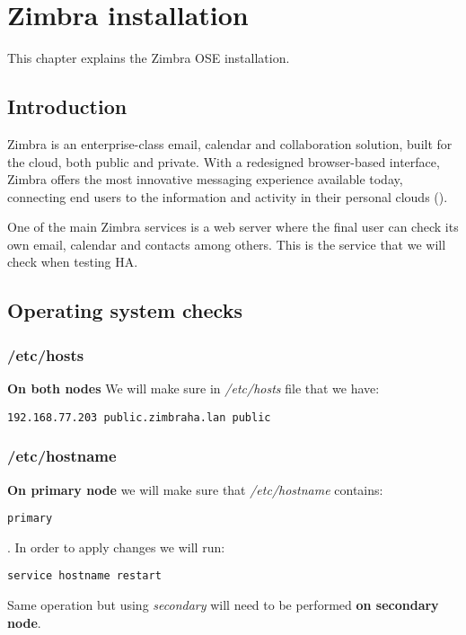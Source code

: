 

\chapter{Zimbra installation}
\label{chap:zimbra-installation}
This chapter explains the Zimbra OSE installation.

\section {Introduction}
Zimbra is an enterprise-class email, calendar and collaboration solution, built for the cloud, both public and private. With a redesigned browser-based interface, Zimbra offers the most innovative messaging experience available today, connecting end users to the information and activity in their personal clouds (\cite{ZimbraWeb}).

One of the main Zimbra services is a web server where the final user can check its own email, calendar and contacts among others. This is the service that we will check when testing HA.

\section {Operating system checks}
\subsection {/etc/hosts}
\textbf{On both nodes}
We will make sure in \textit{/etc/hosts} file that we have:

\begin{verbatim}
192.168.77.203 public.zimbraha.lan public
\end{verbatim}
\subsection {/etc/hostname}
\textbf{On primary node} we will make sure that \textit{/etc/hostname} contains:

\begin{verbatim}
primary
\end{verbatim}
. In order to apply changes we will run:
\begin{verbatim}
service hostname restart
\end{verbatim}

Same operation but using \textit{secondary} will need to be performed \textbf{on secondary node}.

